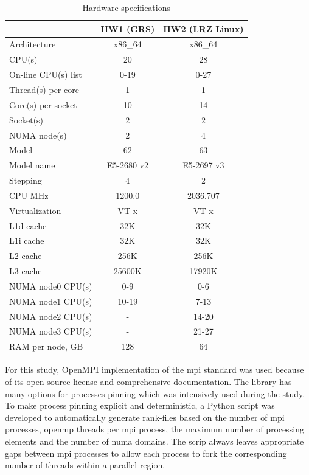 \begin{table}[!h]
\centering
\small
\begin{tabular}{|l|c|c|}
\hline
                    & HW1 (GRS) & HW2 (LRZ Linux) \\ \hline
Architecture        & x86\_64 & x86\_64 \\ \hline
CPU(s)              & 20 &  28 \\ \hline
On-line CPU(s) list & 0-19 &  0-27 \\ \hline
Thread(s) per core  & 1 &  1 \\  \hline
Core(s) per socket  & 10 & 14 \\ \hline
Socket(s)           & 2 &  2 \\ \hline
NUMA node(s)        & 2 &  4 \\ \hline
Model               & 62 &  63 \\ \hline
Model name          & E5-2680 v2 & 
E5-2697 v3 \\ \hline
Stepping            & 4 &  2 \\ \hline
CPU MHz             & 1200.0 &  2036.707 \\ \hline
Virtualization      & VT-x &  VT-x \\ \hline
L1d cache           & 32K &  32K \\ \hline
L1i cache           & 32K &  32K \\ \hline
L2 cache            & 256K &  256K \\ \hline
L3 cache            & 25600K &  17920K \\ \hline
NUMA node0 CPU(s)   & 0-9 &  0-6 \\ \hline
NUMA node1 CPU(s)   & 10-19 &  7-13 \\ \hline
NUMA node2 CPU(s)   & - &  14-20 \\ \hline
NUMA node3 CPU(s)   & - &  21-27 \\ \hline
RAM per node, GB   & 128 &  64 \\ \hline
\end{tabular}
\caption{Hardware specifications}
\label{table:hardware-spec}
\end{table}


For this study, OpenMPI implementation of the \acrshort{mpi} standard was used because of its open-source license and comprehensive documentation. The library has many options for processes pinning which was intensively used during the study.\\


To make process pinning explicit and deterministic, a Python script was developed to automatically generate rank-files based on the number of \acrshort{mpi} processes, \acrshort{openmp} threads per \acrshort{mpi} process, the maximum number of processing elements and the number of \acrshort{numa} domains. The scrip always leaves appropriate gaps between \acrshort{mpi} processes to allow each process to fork the corresponding number of threads within a parallel region.\\


